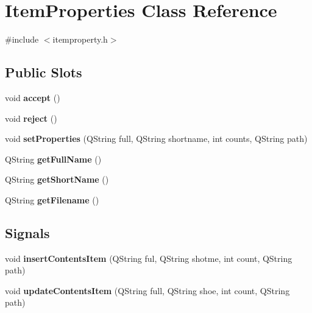 \hypertarget{classItemProperties}{
\section{ItemProperties Class Reference}
\label{classItemProperties}
}


{\ttfamily \#include $<$itemproperty.h$>$}

\subsection*{Public Slots}
\begin{DoxyCompactItemize}
\item 
\hypertarget{classItemProperties_a23b1bf45a29ed0a0feb89b62d7b57f97}{
void {\bfseries accept} ()}
\label{classItemProperties_a23b1bf45a29ed0a0feb89b62d7b57f97}

\item 
\hypertarget{classItemProperties_a04eb605daf6798ddbd974ce3a6a4e769}{
void {\bfseries reject} ()}
\label{classItemProperties_a04eb605daf6798ddbd974ce3a6a4e769}

\item 
\hypertarget{classItemProperties_a35935a07a88770599b164e01f1ebf2ef}{
void {\bfseries setProperties} (QString full, QString shortname, int counts, QString path)}
\label{classItemProperties_a35935a07a88770599b164e01f1ebf2ef}

\item 
\hypertarget{classItemProperties_af3d8212dfa5efffc88b35a25440d5510}{
QString {\bfseries getFullName} ()}
\label{classItemProperties_af3d8212dfa5efffc88b35a25440d5510}

\item 
\hypertarget{classItemProperties_a40e242c1f3da1eb964fe7e12aaa2ea0e}{
QString {\bfseries getShortName} ()}
\label{classItemProperties_a40e242c1f3da1eb964fe7e12aaa2ea0e}

\item 
\hypertarget{classItemProperties_a88da72c91bf68bb33fe1aff998775a24}{
QString {\bfseries getFilename} ()}
\label{classItemProperties_a88da72c91bf68bb33fe1aff998775a24}

\end{DoxyCompactItemize}
\subsection*{Signals}
\begin{DoxyCompactItemize}
\item 
\hypertarget{classItemProperties_a9ddba70c378a1d553b742839c48f950c}{
void {\bfseries insertContentsItem} (QString ful, QString shotme, int count, QString path)}
\label{classItemProperties_a9ddba70c378a1d553b742839c48f950c}

\item 
\hypertarget{classItemProperties_a6e00766fee598a5e80256f32a9dbbe3e}{
void {\bfseries updateContentsItem} (QString full, QString shoe, int count, QString path)}
\label{classItemProperties_a6e00766fee598a5e80256f32a9dbbe3e}

\end{DoxyCompactItemize}
